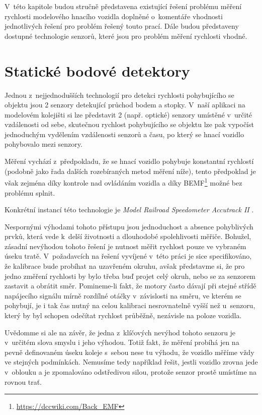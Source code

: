 V~této kapitole budou stručně představena existující řešení problému měření
rychlosti modelového hnacího vozidla doplněné o~komentáře vhodnosti
jednotlivých řešení pro problém řešený touto prací. Dále budou představeny
dostupné technologie senzorů, které jsou pro problém měření rychlosti vhodné.

\section{Statické bodové detektory}

Jednou z~nejjednodušších technologií pro detekci rychlosti pohybujícího se
objektu jsou 2 senzory detekující průchod bodem
a stopky. V~naší aplikaci na modelovém kolejišti si lze představit 2
(např. optické) senzory umístěné v~určité vzdálenosti od sebe, skutečnou
rychlost pohybujícího se objektu lze pak vypočíst jednoduchým vydělením
vzdálenosti senzorů a času, po který se hnací vozidlo pohybovalo mezi senzory.

Měření vychází z~předpokladu, že se hnací vozidlo pohybuje konstantní
rychlostí (podobně jako řada dalších rozebíraných metod měření níže), tento
předpoklad je však zejména díky kontrole nad ovládáním vozidla a díky
BEMF\footnote{\url{https://dccwiki.com/Back\_EMF}}
možné bez problému splnit.

Konkrétní instancí této technologie je \textit{Model Railroad
Speedometer Accutrack II} \cite{accutrackII}.

Nespornými výhodami tohoto přístupu jsou jednoduchost a absence pohyblivých
prvků, která vede k~delší životnosti a dlouhodobé spolehlivosti měřiče.
Bohužel, zásadní nevýhodou tohoto řešení je nutnost měřit rychlost pouze ve
vybraném úseku tratě. V~požadavcích na řešení vyvíjené v~této práci je sice
specifikováno, že kalibrace bude probíhat na uzavřeném okruhu, avšak představme
si, že pro jedno změření rychlosti by bylo třeba buď projet celý okruh, nebo se
za senzorem zastavit a obrátit směr. Pomineme-li fakt, že motory často dávají
při stejné střídě napájecího signálu mírně rozdílné otáčky v~závislosti na
směru, ve kterém se pohybují, je i tak čas nutný na celou kalibraci
nesrovnatelně vyšší než u~senzoru, který by byl schopen odečítat rychlost
průběžně, nezávisle na poloze vozidla.

Uvědomme si ale na závěr, že jedna z~klíčových nevýhod tohoto senzoru je
v~určitém slova smyslu i jeho výhodou. Totiž fakt, že měření probíhá jen na pevně
definovaném úseku koleje s~sebou nese tu výhodu, že vozidlo měříme vždy ve
stejných podmínkách. Nemusíme tedy například řešit, jestli vozidlo zrovna jede
v~oblouku a je zpomalováno odstředivou silou, protože senzor prostě umístíme
na rovnou trať.

